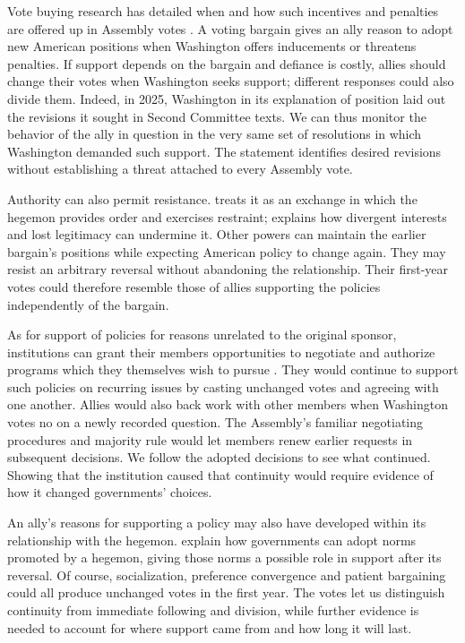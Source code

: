 \documentclass[12pt,authoryear]{elsarticle}
\begin{document}
Vote buying research has detailed when and how such incentives and penalties are offered up in Assembly votes \citep{carter:stone:2015}. A voting bargain gives an ally reason to adopt new American positions when Washington offers inducements or threatens penalties. If support depends on the bargain and defiance is costly, allies should change their votes when Washington seeks support; different responses could also divide them. Indeed, in 2025, Washington in its explanation of position \citep{usun:2025:longform} laid out the revisions it sought in Second Committee texts. We can thus monitor the behavior of the ally in question in the very same set of resolutions in which Washington demanded such support. The statement identifies desired revisions without establishing a threat attached to every Assembly vote.

Authority can also permit resistance. \citet{lake:2009} treats it as an exchange in which the hegemon provides order and exercises restraint; \citet{lake:2018} explains how divergent interests and lost legitimacy can undermine it. Other powers can maintain the earlier bargain's positions while expecting American policy to change again. They may resist an arbitrary reversal without abandoning the relationship. Their first-year votes could therefore resemble those of allies supporting the policies independently of the bargain.

As for support of policies for reasons unrelated to the original sponsor, institutions can grant their members opportunities to negotiate and authorize programs which they themselves wish to pursue \citep{keohane:1984,ikenberry:2001}. They would continue to support such policies on recurring issues by casting unchanged votes and agreeing with one another. Allies would also back work with other members when Washington votes no on a newly recorded question. The Assembly's familiar negotiating procedures and majority rule would let members renew earlier requests in subsequent decisions. We follow the adopted decisions to see what continued. Showing that the institution caused that continuity would require evidence of how it changed governments' choices.

An ally's reasons for supporting a policy may also have developed within its relationship with the hegemon. \citet{ikenberry:kupchan:1990} explain how governments can adopt norms promoted by a hegemon, giving those norms a possible role in support after its reversal. Of course, socialization, preference convergence and patient bargaining could all produce unchanged votes in the first year. The votes let us distinguish continuity from immediate following and division, while further evidence is needed to account for where support came from and how long it will last.
\end{document}
